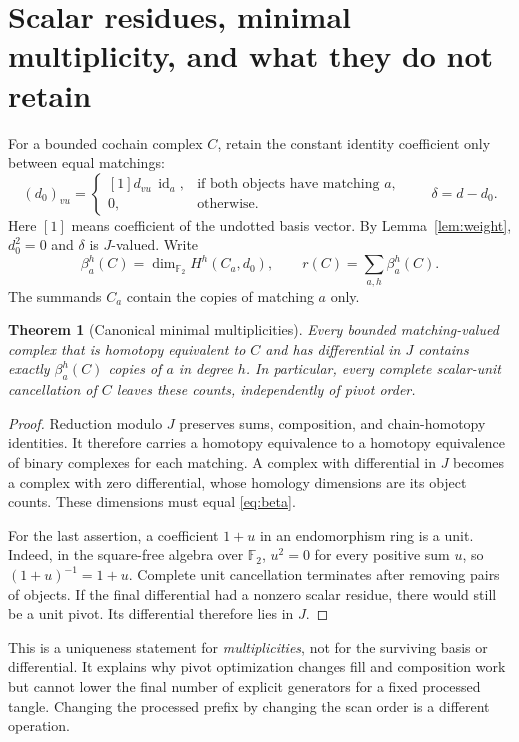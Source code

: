 \documentclass[11pt]{article}
\newtheorem{theorem}{Theorem}[section]
\theoremstyle{definition}\newtheorem{definition}[theorem]{Definition}
\theoremstyle{remark}\newtheorem{remark}[theorem]{Remark}
\newcommand{\F}{{\mathbb F_2}}
\newcommand{\id}{\operatorname{id}}
\begin{document}
\section{Scalar residues, minimal multiplicity, and what they do not retain}
\label{sec:residue}
For a bounded cochain complex $C$, retain the constant identity coefficient only
between equal matchings:
\[
 (d_0)_{vu}=\begin{cases}
 [1]d_{vu}\,\id_a,&\text{if both objects have matching }a,\\
 0,&\text{otherwise.}
 \end{cases}
 \qquad \delta=d-d_0.
\]
Here $[1]$ means coefficient of the undotted basis vector. By
Lemma~\ref{lem:weight}, $d_0^2=0$ and $\delta$ is $J$-valued. Write
\begin{equation}\label{eq:beta}
 \beta^h_a(C)=\dim_\F H^h(C_a,d_0),\qquad
 r(C)=\sum_{a,h}\beta^h_a(C).
\end{equation}
The summands $C_a$ contain the copies of matching $a$ only.

\begin{theorem}[Canonical minimal multiplicities]\label{thm:minimal}
Every bounded matching-valued complex that is homotopy equivalent to $C$ and
has differential in $J$ contains exactly $\beta^h_a(C)$ copies of $a$ in degree
$h$. In particular, every complete scalar-unit cancellation of $C$ leaves these
counts, independently of pivot order.
\end{theorem}
\begin{proof}
Reduction modulo $J$ preserves sums, composition, and chain-homotopy identities.
It therefore carries a homotopy equivalence to a homotopy equivalence of binary
complexes for each matching. A complex with differential in $J$ becomes a complex
with zero differential, whose homology dimensions are its object counts.
These dimensions must equal \eqref{eq:beta}.

For the last assertion, a coefficient $1+u$ in an endomorphism ring is a unit.
Indeed, in the square-free algebra over $\F$, $u^2=0$ for every positive sum
$u$, so $(1+u)^{-1}=1+u$. Complete unit cancellation terminates after removing
pairs of objects. If the final differential had a nonzero scalar residue, there
would still be a unit pivot. Its differential therefore lies in $J$.
\end{proof}

This is a uniqueness statement for \emph{multiplicities}, not for the surviving
basis or differential. It explains why pivot optimization changes fill and
composition work but cannot lower the final number of explicit generators for
a fixed processed tangle. Changing the processed prefix by changing the scan
order is a different operation.
\end{document}
